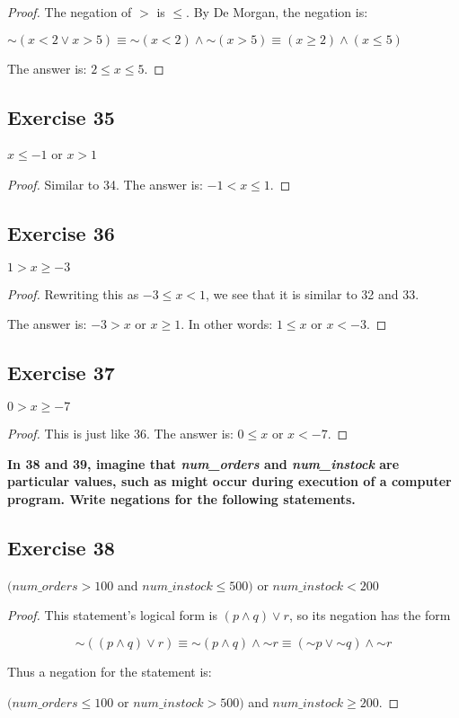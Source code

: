 \documentclass[14pt]{extarticle}
\begin{document}
\begin{proof}
    The negation of $>$ is $\leq$. By De Morgan, the negation is:

    ${\sim(x < 2 \vee x > 5)} \equiv {\sim (x < 2)} \wedge {\sim (x > 5)} \equiv (x \geq 2) \wedge (x \leq 5)$

    The answer is: $2 \leq x \leq 5$.
\end{proof}

\subsection{Exercise 35}
$x \leq -1$ or $x > 1$

\begin{proof}
    Similar to 34. The answer is: $-1 < x \leq 1$.
\end{proof}

\subsection{Exercise 36}
$1 > x \geq -3$

\begin{proof}
    Rewriting this as $-3 \leq x < 1$, we see that it is similar to 32 and 33.

    The answer is: $-3 > x$ or $x \geq 1$. In other words: $1 \leq x$ or $x < -3$.
\end{proof}

\subsection{Exercise 37}
$0 > x \geq -7$

\begin{proof}
    This is just like 36. The answer is: $0 \leq x$ or $x < -7$.
\end{proof}

{\bf In 38 and 39, imagine that {\it num\_orders} and {\it num\_instock} are particular values, such as might occur during execution of a computer program. Write negations for the following statements.}

\subsection{Exercise 38}
$(num\_orders > 100$ and $num\_instock \leq 500)$ or
$num\_instock < 200$

\begin{proof}
    This statement’s logical form is $(p \wedge q) \vee r$, so its negation has the form

    $$
        {\sim((p \wedge q) \vee r)} \equiv {\sim (p \wedge q)} \wedge {\sim r} \equiv ({\sim p} \vee {\sim q}) \wedge {\sim r}
    $$

    Thus a negation for the statement is:

    $(num\_orders \leq 100$ or $num\_instock > 500)$ and $num\_instock \geq 200$.
\end{proof}
\end{document}
